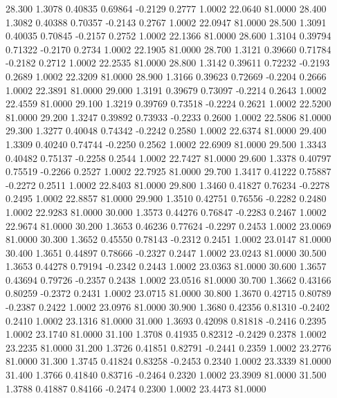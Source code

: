   28.300   1.3078   0.40835   0.69864  -0.2129   0.2777   1.0002  22.0640  81.0000
  28.400   1.3082   0.40388   0.70357  -0.2143   0.2767   1.0002  22.0947  81.0000
  28.500   1.3091   0.40035   0.70845  -0.2157   0.2752   1.0002  22.1366  81.0000
  28.600   1.3104   0.39794   0.71322  -0.2170   0.2734   1.0002  22.1905  81.0000
  28.700   1.3121   0.39660   0.71784  -0.2182   0.2712   1.0002  22.2535  81.0000
  28.800   1.3142   0.39611   0.72232  -0.2193   0.2689   1.0002  22.3209  81.0000
  28.900   1.3166   0.39623   0.72669  -0.2204   0.2666   1.0002  22.3891  81.0000
  29.000   1.3191   0.39679   0.73097  -0.2214   0.2643   1.0002  22.4559  81.0000
  29.100   1.3219   0.39769   0.73518  -0.2224   0.2621   1.0002  22.5200  81.0000
  29.200   1.3247   0.39892   0.73933  -0.2233   0.2600   1.0002  22.5806  81.0000
  29.300   1.3277   0.40048   0.74342  -0.2242   0.2580   1.0002  22.6374  81.0000
  29.400   1.3309   0.40240   0.74744  -0.2250   0.2562   1.0002  22.6909  81.0000
  29.500   1.3343   0.40482   0.75137  -0.2258   0.2544   1.0002  22.7427  81.0000
  29.600   1.3378   0.40797   0.75519  -0.2266   0.2527   1.0002  22.7925  81.0000
  29.700   1.3417   0.41222   0.75887  -0.2272   0.2511   1.0002  22.8403  81.0000
  29.800   1.3460   0.41827   0.76234  -0.2278   0.2495   1.0002  22.8857  81.0000
  29.900   1.3510   0.42751   0.76556  -0.2282   0.2480   1.0002  22.9283  81.0000
  30.000   1.3573   0.44276   0.76847  -0.2283   0.2467   1.0002  22.9674  81.0000
  30.200   1.3653   0.46236   0.77624  -0.2297   0.2453   1.0002  23.0069  81.0000
  30.300   1.3652   0.45550   0.78143  -0.2312   0.2451   1.0002  23.0147  81.0000
  30.400   1.3651   0.44897   0.78666  -0.2327   0.2447   1.0002  23.0243  81.0000
  30.500   1.3653   0.44278   0.79194  -0.2342   0.2443   1.0002  23.0363  81.0000
  30.600   1.3657   0.43694   0.79726  -0.2357   0.2438   1.0002  23.0516  81.0000
  30.700   1.3662   0.43166   0.80259  -0.2372   0.2431   1.0002  23.0715  81.0000
  30.800   1.3670   0.42715   0.80789  -0.2387   0.2422   1.0002  23.0976  81.0000
  30.900   1.3680   0.42356   0.81310  -0.2402   0.2410   1.0002  23.1316  81.0000
  31.000   1.3693   0.42098   0.81818  -0.2416   0.2395   1.0002  23.1740  81.0000
  31.100   1.3708   0.41935   0.82312  -0.2429   0.2378   1.0002  23.2235  81.0000
  31.200   1.3726   0.41851   0.82791  -0.2441   0.2359   1.0002  23.2776  81.0000
  31.300   1.3745   0.41824   0.83258  -0.2453   0.2340   1.0002  23.3339  81.0000
  31.400   1.3766   0.41840   0.83716  -0.2464   0.2320   1.0002  23.3909  81.0000
  31.500   1.3788   0.41887   0.84166  -0.2474   0.2300   1.0002  23.4473  81.0000
